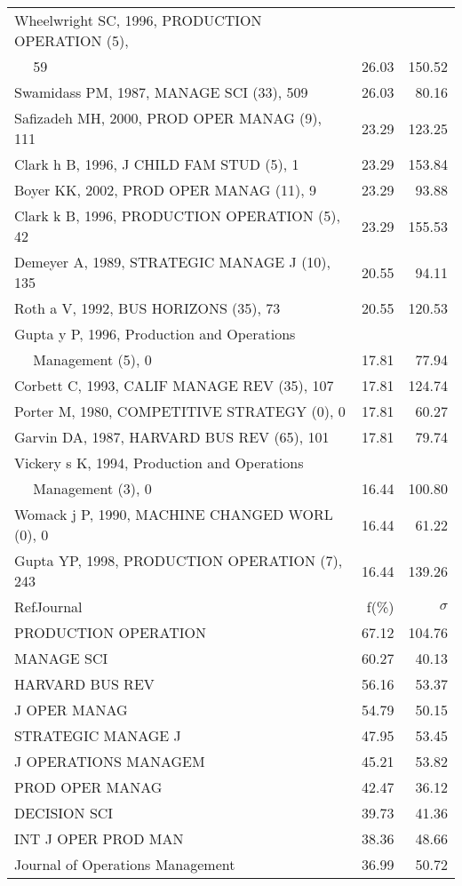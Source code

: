 \documentclass[a4paper,11pt]{report}
\begin{document}
\begin{landscape}
\begin{table}[!ht]
{\begin{tabular}{|l r r|}
Wheelwright SC, 1996, PRODUCTION OPERATION (5), &  & \\
$\quad$ 59 & 26.03 & 150.52\\
Swamidass PM, 1987, MANAGE SCI (33), 509 & 26.03 & 80.16\\
Safizadeh MH, 2000, PROD OPER MANAG (9), 111 & 23.29 & 123.25\\
Clark h B, 1996, J CHILD FAM STUD (5), 1 & 23.29 & 153.84\\
Boyer KK, 2002, PROD OPER MANAG (11), 9 & 23.29 & 93.88\\
Clark k B, 1996, PRODUCTION OPERATION (5), 42 & 23.29 & 155.53\\
Demeyer A, 1989, STRATEGIC MANAGE J (10), 135 & 20.55 & 94.11\\
Roth a V, 1992, BUS HORIZONS (35), 73 & 20.55 & 120.53\\
Gupta y P, 1996, Production and Operations &  & \\
$\quad$ Management (5), 0 & 17.81 & 77.94\\
Corbett C, 1993, CALIF MANAGE REV (35), 107 & 17.81 & 124.74\\
Porter M, 1980, COMPETITIVE STRATEGY (0), 0 & 17.81 & 60.27\\
Garvin DA, 1987, HARVARD BUS REV (65), 101 & 17.81 & 79.74\\
Vickery s K, 1994, Production and Operations &  & \\
$\quad$ Management (3), 0 & 16.44 & 100.80\\
Womack j P, 1990, MACHINE CHANGED WORL (0), 0 & 16.44 & 61.22\\
Gupta YP, 1998, PRODUCTION OPERATION (7), 243 & 16.44 & 139.26\\
\hline
\hline
RefJournal & f(\%) & $\sigma$\\
\hline
PRODUCTION OPERATION & 67.12 & 104.76\\
MANAGE SCI & 60.27 & 40.13\\
HARVARD BUS REV & 56.16 & 53.37\\
J OPER MANAG & 54.79 & 50.15\\
STRATEGIC MANAGE J & 47.95 & 53.45\\
J OPERATIONS MANAGEM & 45.21 & 53.82\\
PROD OPER MANAG & 42.47 & 36.12\\
DECISION SCI & 39.73 & 41.36\\
INT J OPER PROD MAN & 38.36 & 48.66\\
Journal of Operations Management & 36.99 & 50.72\\
\hline
\end{tabular}
}
\end{table}


\end{landscape}
\end{document}
